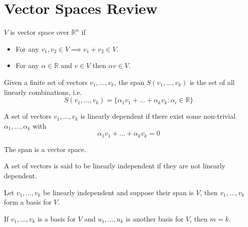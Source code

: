 
\section{Vector Spaces Review}

\begin{definition}
    $V$ is vector space over $\mathbb{R}^n$ if
    \begin{itemize}
        \item For any $v_1, v_2 \in V \implies v_1 + v_2 \in V$.
        \item For any $\alpha \in \mathbb{R}$ and $v \in V$ then
        $\alpha v \in V$.
    \end{itemize}
\end{definition}

\begin{definition}
    Given a finite set of vectors $v_1, ..., v_k$, the span $S(v_1,
    ..., v_k)$ is the set of all linearly combinations, i.e.
    $$
    S(v_1, ..., v_k) = \{\alpha_1v_1 + ... + \alpha_kv_k : \alpha_i
    \in \mathbb{R}\}
    $$
\end{definition}

\begin{definition}
    A set of vectors $v_1, ..., v_k$ is linearly dependent if there
    exist some non-trivial $\alpha_1, ..., \alpha_k$ with
    $$
    \alpha_1v_1 + ... + \alpha_kv_k = 0
    $$
\end{definition}

\begin{lemma}
    The span is a vector space.
\end{lemma}

\begin{definition}
    A set of vectors is said to be linearly independent if they are
    not linearly dependent.
\end{definition}

\begin{definition}
    Let $v_1, ..., v_k$ be linearly independent and suppose their
    span is $V$, then $v_1, ..., v_k$ form a basis for $V$.
\end{definition}

\begin{lemma}
    If $v_1, ..., v_k$ is a basis for $V$ and $u_1, ..., u_k$ is
    another basis for $V$, then $m = k$.
\end{lemma}

